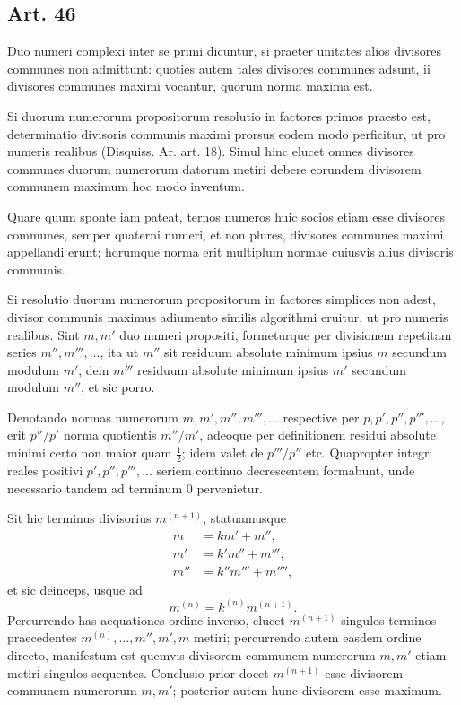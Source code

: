 \documentclass[12pt]{article}
\newcommand{\art}[1]{\subsection*{Art. #1}}
\begin{document}
\art{46}
Duo numeri complexi inter se primi dicuntur, si praeter unitates alios divisores communes non admittunt: quoties autem tales divisores communes adsunt, ii divisores communes maximi vocantur, quorum norma maxima est.

Si duorum numerorum propositorum resolutio in factores primos praesto est, determinatio divisoris communis maximi prorsus eodem modo perficitur, ut pro numeris realibus (Disquiss. Ar. art. 18). Simul hinc elucet omnes divisores communes duorum numerorum datorum metiri debere eorundem divisorem communem maximum hoc modo inventum.

Quare quum sponte iam pateat, ternos numeros huic socios etiam esse divisores communes, semper quaterni numeri, et non plures, divisores communes maximi appellandi erunt; horumque norma erit multiplum normae cuiusvis alius divisoris communis.

Si resolutio duorum numerorum propositorum in factores simplices non adest, divisor communis maximus adiumento similis algorithmi eruitur, ut pro numeris realibus. Sint $m,m'$ duo numeri propositi, formeturque per divisionem repetitam series $m'',m''',\ldots$, ita ut $m''$ sit residuum absolute minimum ipsius $m$ secundum modulum $m'$, dein $m'''$ residuum absolute minimum ipsius $m'$ secundum modulum $m''$, et sic porro.

Denotando normas numerorum $m,m',m'',m''',\ldots$ respective per $p,p',p'',p''',\ldots$, erit $p''/p'$ norma quotientis $m''/m'$, adeoque per definitionem residui absolute minimi certo non maior quam $\frac12$; idem valet de $p'''/p''$ etc. Quapropter integri reales positivi $p',p'',p''',\ldots$ seriem continuo decrescentem formabunt, unde necessario tandem ad terminum $0$ pervenietur.

Sit hic terminus divisorius $m^{(n+1)}$, statuamusque
\[
\begin{aligned}
 m&=km'+m'',\\
 m'&=k'm''+m''',\\
 m''&=k''m'''+m'''',
\end{aligned}
\]
et sic deinceps, usque ad
\[
m^{(n)}=k^{(n)}m^{(n+1)}.
\]
Percurrendo has aequationes ordine inverso, elucet $m^{(n+1)}$ singulos terminos praecedentes $m^{(n)},\ldots,m'',m',m$ metiri; percurrendo autem easdem ordine directo, manifestum est quemvis divisorem communem numerorum $m,m'$ etiam metiri singulos sequentes. Conclusio prior docet $m^{(n+1)}$ esse divisorem communem numerorum $m,m'$; posterior autem hunc divisorem esse maximum.
\end{document}
